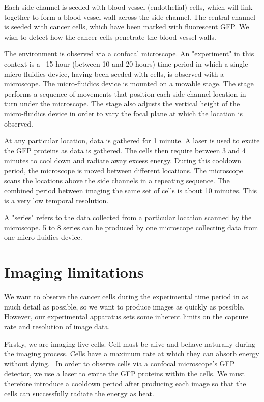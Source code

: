 Each side channel is seeded with blood vessel (endothelial) cells, which will link together to form a blood vessel wall across the side channel. The central channel is seeded with cancer cells, which have been marked with fluorescent GFP. We wish to detect how the cancer cells penetrate the blood vessel walls.

The environment is observed via a confocal microscope. An "experiment" in this context is a ~15-hour (between 10 and 20 hours) time period in which a single micro-fluidics device, having been seeded with cells, is observed with a microscope. The micro-fluidics device is mounted on a movable stage. The stage performs a sequence of movements that position each side channel location in turn under the microscope. The stage also adjusts the vertical height of the micro-fluidics device in order to vary the focal plane at which the location is observed.

At any particular location, data is gathered for 1 minute. A laser is used to excite the GFP proteins as data is gathered. The cells then require between 3 and 4 minutes to cool down and radiate away excess energy. During this cooldown period, the microscope is moved between different locations. The microscope scans the locations above the side channels in a repeating sequence. The combined period between imaging the same set of cells is about 10 minutes. This is a very low temporal resolution.

A "series" refers to the data collected from a particular location scanned by the microscope. 5 to 8 series can be produced by one microscope collecting data from one micro-fluidics device.

\section{Imaging limitations}

We want to observe the cancer cells during the experimental time period in as much detail as possible, so we want to produce images as quickly as possible. However, our experimental apparatus sets some inherent limits on the capture rate and resolution of image data.

Firstly, we are imaging live cells. Cell must be alive and behave naturally during the imaging process. Cells have a maximum rate at which they can absorb energy without dying.~\cite{lapotko} In order to observe cells via a confocal microscope's GFP detector, we use a laser to excite the GFP proteins within the cells. We must therefore introduce a cooldown period after producing each image so that the cells can successfully radiate the energy as heat.

